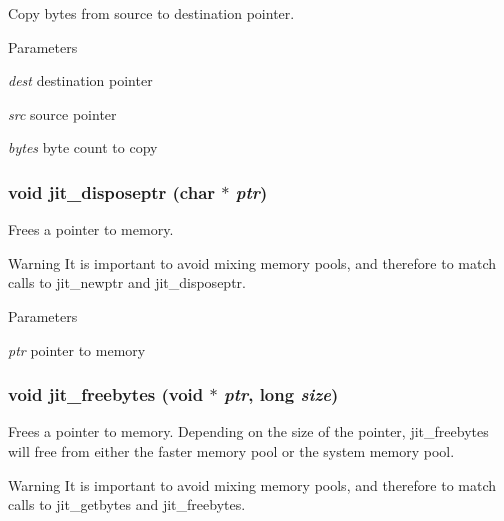 Copy bytes from source to destination pointer. 
\begin{DoxyParams}{Parameters}
\item[{\em dest}]destination pointer \item[{\em src}]source pointer \item[{\em bytes}]byte count to copy \end{DoxyParams}
\hypertarget{group__memorymod_gaa5a4969fb76823dd0c3a679a5bd01222}{
\subsubsection[{jit\_\-disposeptr}]{\setlength{\rightskip}{0pt plus 5cm}void jit\_\-disposeptr (char $\ast$ {\em ptr})}}
\label{group__memorymod_gaa5a4969fb76823dd0c3a679a5bd01222}


Frees a pointer to memory. \begin{DoxyWarning}{Warning}
It is important to avoid mixing memory pools, and therefore to match calls to jit\_\-newptr and jit\_\-disposeptr.
\end{DoxyWarning}

\begin{DoxyParams}{Parameters}
\item[{\em ptr}]pointer to memory \end{DoxyParams}
\hypertarget{group__memorymod_ga4a6a1b9a98f66b50735f69e6acf64af0}{
\subsubsection[{jit\_\-freebytes}]{\setlength{\rightskip}{0pt plus 5cm}void jit\_\-freebytes (void $\ast$ {\em ptr}, \/  long {\em size})}}
\label{group__memorymod_ga4a6a1b9a98f66b50735f69e6acf64af0}


Frees a pointer to memory. Depending on the size of the pointer, jit\_\-freebytes will free from either the faster memory pool or the system memory pool.

\begin{DoxyWarning}{Warning}
It is important to avoid mixing memory pools, and therefore to match calls to jit\_\-getbytes and jit\_\-freebytes.
\end{DoxyWarning}

